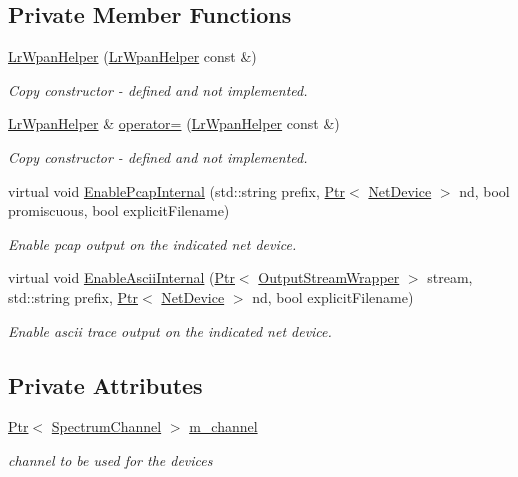 \subsection*{Private Member Functions}
\begin{DoxyCompactItemize}
\item 
\hyperlink{classns3_1_1LrWpanHelper_a1305978686c4f824e30cc8c4302a2dcf}{Lr\+Wpan\+Helper} (\hyperlink{classns3_1_1LrWpanHelper}{Lr\+Wpan\+Helper} const \&)
\begin{DoxyCompactList}\small\item\em Copy constructor -\/ defined and not implemented. \end{DoxyCompactList}\item 
\hyperlink{classns3_1_1LrWpanHelper}{Lr\+Wpan\+Helper} \& \hyperlink{classns3_1_1LrWpanHelper_a3f16fba7b4bb749726f02e2a7d029556}{operator=} (\hyperlink{classns3_1_1LrWpanHelper}{Lr\+Wpan\+Helper} const \&)
\begin{DoxyCompactList}\small\item\em Copy constructor -\/ defined and not implemented. \end{DoxyCompactList}\item 
virtual void \hyperlink{classns3_1_1LrWpanHelper_a9599950ff3cf6cce0538b68a9a267852}{Enable\+Pcap\+Internal} (std\+::string prefix, \hyperlink{classns3_1_1Ptr}{Ptr}$<$ \hyperlink{classns3_1_1NetDevice}{Net\+Device} $>$ nd, bool promiscuous, bool explicit\+Filename)
\begin{DoxyCompactList}\small\item\em Enable pcap output on the indicated net device. \end{DoxyCompactList}\item 
virtual void \hyperlink{classns3_1_1LrWpanHelper_a0accf3ecc8c464cde332c92dca565c05}{Enable\+Ascii\+Internal} (\hyperlink{classns3_1_1Ptr}{Ptr}$<$ \hyperlink{classns3_1_1OutputStreamWrapper}{Output\+Stream\+Wrapper} $>$ stream, std\+::string prefix, \hyperlink{classns3_1_1Ptr}{Ptr}$<$ \hyperlink{classns3_1_1NetDevice}{Net\+Device} $>$ nd, bool explicit\+Filename)
\begin{DoxyCompactList}\small\item\em Enable ascii trace output on the indicated net device. \end{DoxyCompactList}\end{DoxyCompactItemize}
\subsection*{Private Attributes}
\begin{DoxyCompactItemize}
\item 
\hyperlink{classns3_1_1Ptr}{Ptr}$<$ \hyperlink{classns3_1_1SpectrumChannel}{Spectrum\+Channel} $>$ \hyperlink{classns3_1_1LrWpanHelper_a13775159dee475491181d3fb0a8069ec}{m\+\_\+channel}
\begin{DoxyCompactList}\small\item\em channel to be used for the devices \end{DoxyCompactList}\end{DoxyCompactItemize}


